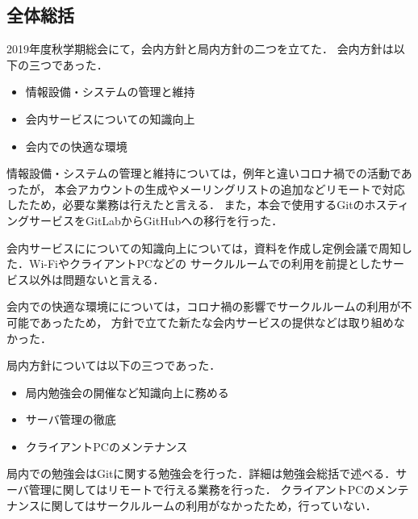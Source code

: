 \subsection*{全体総括}


2019年度秋学期総会にて，会内方針と局内方針の二つを立てた．
会内方針は以下の三つであった．
\begin{itemize}
    \item 情報設備・システムの管理と維持
    \item 会内サービスについての知識向上
    \item 会内での快適な環境
\end{itemize}

情報設備・システムの管理と維持については，例年と違いコロナ禍での活動であったが，
本会アカウントの生成やメーリングリストの追加などリモートで対応したため，必要な業務は行えたと言える．
また，本会で使用するGitのホスティングサービスをGitLabからGitHubへの移行を行った．

会内サービスにについての知識向上については，資料を作成し定例会議で周知した．Wi-FiやクライアントPCなどの
サークルルームでの利用を前提としたサービス以外は問題ないと言える．

会内での快適な環境にについては，コロナ禍の影響でサークルルームの利用が不可能であったため，
方針で立てた新たな会内サービスの提供などは取り組めなかった．

局内方針については以下の三つであった．
\begin{itemize}
    \item 局内勉強会の開催など知識向上に務める
    \item サーバ管理の徹底
    \item クライアントPCのメンテナンス
\end{itemize}
  
局内での勉強会はGitに関する勉強会を行った．詳細は勉強会総括で述べる．サーバ管理に関してはリモートで行える業務を行った．
クライアントPCのメンテナンスに関してはサークルルームの利用がなかったため，行っていない．
